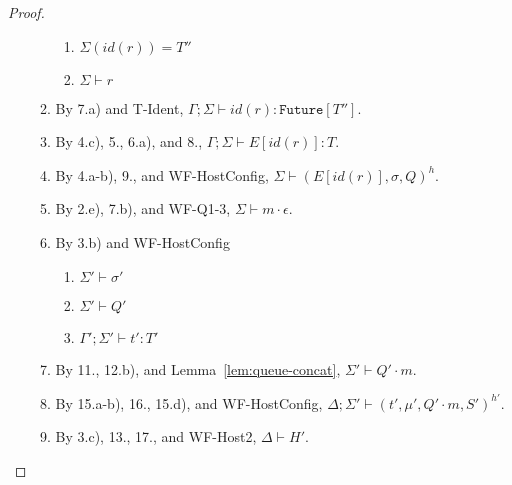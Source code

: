 \documentclass{article}
\theoremstyle{definition}
\newcommand{\Req}[3]{\text{Req}(#1, #2, #3)}
\begin{document}
\begin{proof}
\begin{itemize}
\begin{enumerate}
  \begin{enumerate}[label=(\alph*)]
  \item $\Sigma(id(r)) = T''$
  \item $\Sigma \vdash r$
  \end{enumerate}
\item By 7.a) and T-Ident, $\Gamma ; \Sigma \vdash id(r) : \texttt{Future}[T'']$.
\item By 4.c), 5., 6.a), and 8., $\Gamma ; \Sigma \vdash E[id(r)] : T$.
\item By 4.a-b), 9., and WF-HostConfig, $\Sigma \vdash (E[id(r)], \sigma, Q)^h$.
\item By 2.e), 7.b), and WF-Q1-3, $\Sigma \vdash m \cdot \epsilon$.
\item By 3.b) and WF-HostConfig
  \begin{enumerate}[label=(\alph*)]
  \item $\Sigma' \vdash \sigma'$
  \item $\Sigma' \vdash Q'$
  \item $\Gamma' ; \Sigma' \vdash t' : T'$
  \end{enumerate}



\item By 11., 12.b), and Lemma~\ref{lem:queue-concat}, $\Sigma' \vdash Q' \cdot m$.
\item By 15.a-b), 16., 15.d), and WF-HostConfig, $\Delta ; \Sigma' \vdash (t', \mu', Q' \cdot m, S')^{h'}$.
\item By 3.c), 13., 17., and WF-Host2, $\Delta \vdash H'$.
\end{enumerate}


\end{itemize}
\end{proof}
\end{document}
